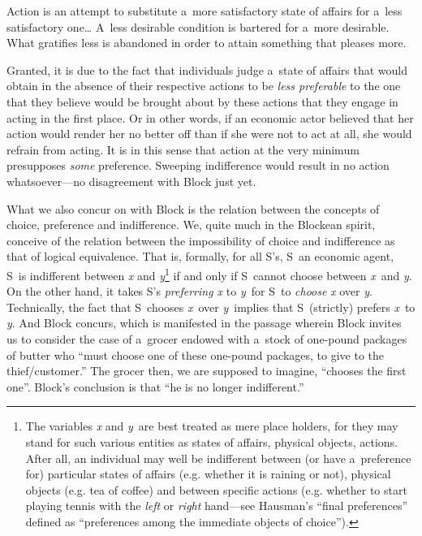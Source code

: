 Action is an attempt to substitute a~more satisfactory state of affairs for a~less satisfactory one… A~less desirable condition is bartered for a~more desirable. What gratifies less is abandoned in order to attain something that pleases more.



Granted, it is due to the fact that individuals judge a~state of affairs that would obtain in the absence of their respective actions to be \textit{less preferable} to the one that they believe would be brought about by these actions that they engage in acting in the first place. Or in other words, if an economic actor believed that her action would render her no better off than if she were not to act at all, she would refrain from acting. It is in this sense that action at the very minimum presupposes \textit{some} preference. Sweeping indifference would result in no action whatsoever---no disagreement with Block just yet.



What we also concur on with Block is the relation between the concepts of choice, preference and indifference. We, quite much in the Blockean spirit, conceive of the relation between the impossibility of choice and indifference as that of logical equivalence. That is, formally, for all S's, S~an economic agent, S~is indifferent between \textit{x} and \textit{y}\footnote{The variables \textit{x} and \textit{y}~are best treated as mere place holders, for they may stand for such various entities as states of affairs, physical objects, actions. After all, an individual may well be indifferent between (or have a~preference for) particular states of affairs (e.g. whether it is raining or not), physical objects (e.g. tea of coffee) and between specific actions (e.g. whether to start playing tennis with the \textit{left} or \textit{right} hand---see Hausman's 
\parencite*[][p.27]{hausman_preference_2011} %
 ``final preferences'' defined as ``preferences among the immediate objects of choice''). } if and only if S~cannot choose between \textit{x}~and \textit{y}. On the other hand, it takes S's \textit{preferring x} to \textit{y}~for S~to \textit{choose} \textit{x} over \textit{y}. Technically, the fact that S~chooses \textit{x}~over \textit{y}~implies that S~(strictly) prefers \textit{x}~to \textit{y}. And Block 
\parencite*[][p.47]{block_response_2022} %
 concurs, which is manifested in the passage wherein Block invites us to consider the case of a~grocer endowed with a~stock of one-pound packages of butter who ``must choose one of these one-pound packages, to give to the thief/customer.'' The grocer then, we are supposed to imagine, ``chooses the first one''. Block's conclusion is that ``he is no longer indifferent.''



